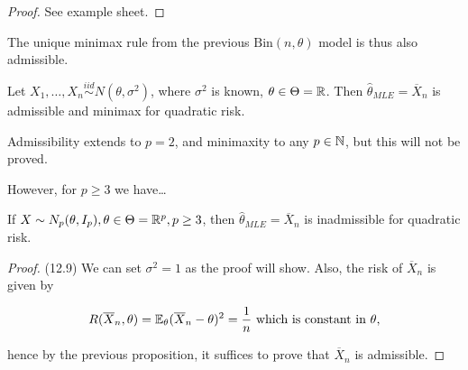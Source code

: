 \documentclass[a4paper]{article}
\begin{document}
\begin{proof}
	See example sheet.
\end{proof}

\begin{remark}
	The unique minimax rule from the previous $\text{Bin}(n, \theta)$ model is thus also admissible.
\end{remark}

\begin{thm}
	Let $X_1, \ldots, X_n \stackrel{iid}{\sim} N(\theta, \sigma^2)$, where  $\sigma^2$ is known, $\theta \in \Theta = \mathbb{R}$. Then $\hat{\theta}_{MLE} = \overline{X}_n$ is admissible and minimax for quadratic risk.
\end{thm}

\begin{remark}
	Admissibility extends to $p=2$, and minimaxity to any $p \in \mathbb{N}$, but this will not be proved.
\end{remark}

However, for $p\ge 3$ we have\ldots

\begin{thm}
	If $X \sim N_p(\theta, I_p), \theta \in \Theta = \mathbb{R}^{p}, p\ge 3$, then $\hat{\theta}_{MLE} = \overline{X}_n$ is inadmissible for quadratic risk. 	
\end{thm}

\begin{proof}(12.9)
	We can set $\sigma^2=1$ as the proof will show. Also, the risk of $\overline{X}_n$ is given by

	\[
		R(\overline{X}_n, \theta) = \mathbb{E}_{\theta} (\overline{X}_n - \theta)^2 =\frac{1}{n} \text{ which is constant in } \theta
	,\]

	hence by the previous proposition,  it suffices to prove that $\overline{X}_n$ is admissible.
\end{proof}
\end{document}
